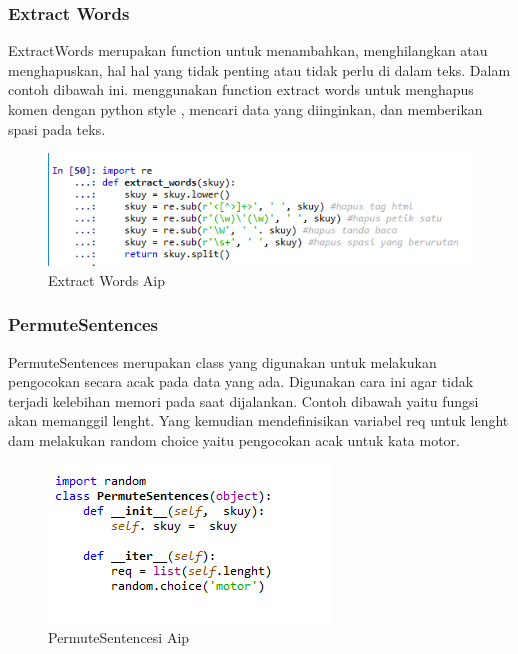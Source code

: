 \subsubsection{Extract Words}
ExtractWords merupakan function untuk menambahkan, menghilangkan atau menghapuskan, hal hal yang tidak penting atau tidak perlu di dalam teks. Dalam contoh dibawah ini. menggunakan function extract words untuk menghapus komen dengan python style , mencari data yang diinginkan, dan memberikan spasi pada teks.
\begin{figure}[ht]
\centering
\includegraphics[scale=0.3]{figures/AIP/e15.PNG}
\caption{Extract Words Aip}
\label{Praktek}
\end{figure}

\subsubsection{PermuteSentences}
PermuteSentences merupakan class yang digunakan untuk melakukan pengocokan secara acak pada data yang ada. Digunakan cara ini agar tidak terjadi kelebihan memori pada saat dijalankan. Contoh dibawah yaitu fungsi akan memanggil lenght. Yang kemudian mendefinisikan variabel req untuk lenght dam melakukan random choice yaitu pengocokan acak untuk kata motor.
\begin{figure}[ht]
\centering
\includegraphics[scale=0.3]{figures/AIP/e16.PNG}
\caption{PermuteSentencesi Aip}
\label{Praktek}
\end{figure}


